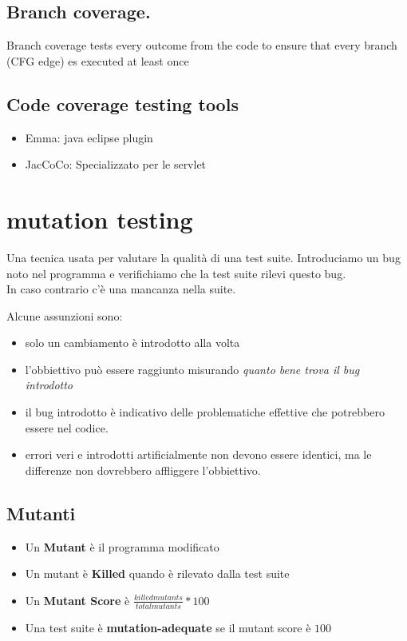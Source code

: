 \documentclass{article}
\begin{document}
\subsection{Branch coverage.}
Branch coverage tests every outcome from the code to ensure that every branch (CFG edge) es executed at least once

\subsection{Code coverage testing tools}
\begin{itemize}
    \item Emma: java eclipse plugin
    \item JacCoCo: Specializzato per le servlet
\end{itemize}

\section{mutation testing}
Una tecnica usata per valutare la qualità di una test suite. Introduciamo un bug noto nel programma e verifichiamo che la test suite rilevi questo bug.\\
In caso contrario c'è una mancanza nella suite.

Alcune assunzioni sono:\begin{itemize}
    \item solo un cambiamento è introdotto alla volta
    \item l'obbiettivo può essere raggiunto misurando \textit{quanto bene trova il bug introdotto}
    \item il bug introdotto è indicativo delle problematiche effettive che potrebbero essere nel codice.
    \item errori veri e introdotti artificialmente non devono essere identici, ma le differenze non dovrebbero affliggere l'obbiettivo.
\end{itemize}

\subsection{Mutanti}
\begin{itemize}
    \item Un \textbf{Mutant} è il programma modificato
    \item Un mutant è \textbf{Killed} quando è rilevato dalla test suite
    \item Un \textbf{Mutant Score} è $\frac{killed mutants}{total mutants}*100$
    \item Una test suite è \textbf{mutation-adequate} se il mutant score è $100$
\end{itemize}
\end{document}
